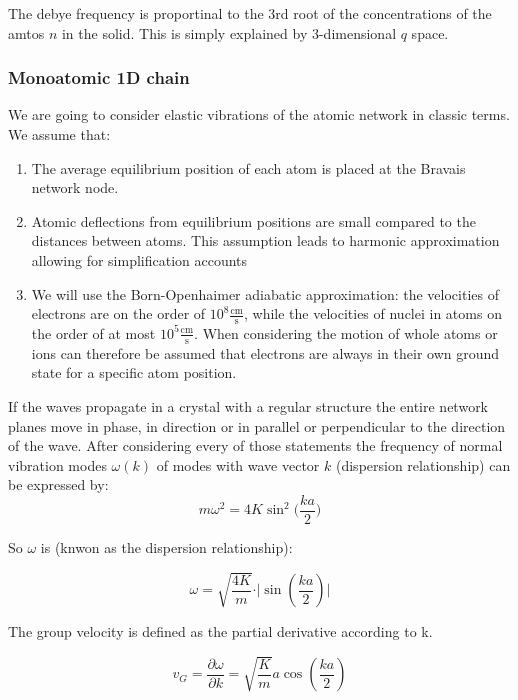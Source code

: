 The debye frequency is proportinal to the 3rd root of the concentrations
of the amtos $n$ in the solid. This is simply explained by 3-dimensional 
$q$ space.

\subsubsection*{Monoatomic 1D chain}

We are going to consider elastic vibrations of the atomic network in classic
terms. We assume that:
\begin{enumerate}
\item The average equilibrium position of each atom is placed at the Bravais 
        network node.
\item Atomic deflections from equilibrium positions are small compared to the
        distances between atoms. This assumption leads to harmonic 
        approximation allowing for simplification accounts
\item We will use the Born-Openhaimer adiabatic approximation: the velocities
        of electrons are on the order of $10^8 \mathrm{\frac{cm}{s}}$, while 
        the velocities of nuclei in atoms on the order of at most $10^5 \mathrm
        {\frac{cm}{s}}$. When considering the motion of whole atoms or ions can 
        therefore be assumed that electrons are always in their own
        ground state for a specific atom position.
\end{enumerate}
If the waves propagate in a crystal with a regular structure the entire network planes move in phase, in direction or in parallel or perpendicular to the direction of the wave. After considering every of those statements the frequency of normal vibration modes
$\omega(k)$ of modes with wave vector $k$ (dispersion relationship) can be expressed by:
\begin{equation}
    m\omega^2 = 4K \sin^2\bigg(\frac{ka}{2}\bigg)  
\end{equation}

So $\omega$ is (knwon as the dispersion relationship):

\begin{equation}
    \omega = \sqrt{\frac{4K}{m}}\cdot \vert \sin \left(\frac{ka}{2} \right) \vert
    \label{eq:disp_relation} 
\end{equation}

The group velocity is defined as the partial derivative according to k.

$$v_G = \frac{\partial \omega}{\partial k} = 
     \sqrt{\frac{K}{m}} a \cos\left(\frac{ka}{2} \right)$$


